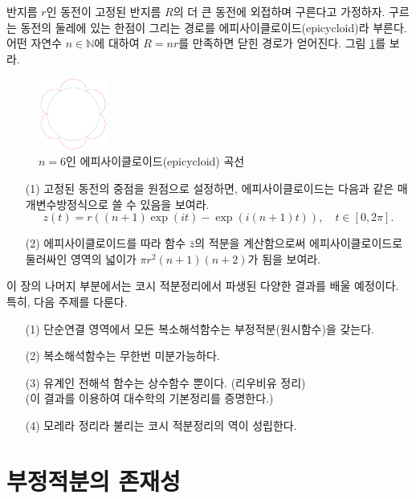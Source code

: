 \begin{salt_exercise} \label{ex-3-22}
반지름 $r$인 동전이 고정된 반지름 $R$의  더 큰 동전에 외접하며 구른다고 가정하자.
구르는 동전의 둘레에 있는 한점이 그리는 경로를 에피사이클로이드(epicycloid)라 부른다.
어떤 자연수 $n\in\mathbb N$에 대하여 $R=nr$를 만족하면 닫힌 경로가 얻어진다.
그림 \ref{fig-3-15}를 보라.

\begin{figure}[!h]
\begin{center}
\includegraphics[width=0.2\textwidth]{./SaltChapter/figs/fig-3-15}
\end{center}
\caption{$n=6$인 에피사이클로이드(epicycloid) 곡선}
\label{fig-3-15}
\end{figure}

\begin{itemize}
\item[(1)] 고정된 동전의 중점을 원점으로 설정하면,
에피사이클로이드는 다음과 같은 매개변수방정식으로 쓸 수 있음을 보여라.
\[
 z(t) = r((n+1)\exp(it) - \exp(i(n+1)t)), \quad t\in [0,2\pi].
\]
\item[(2)] 에피사이클로이드를 따라 함수 $\bar z$의 적분을 계산함으로써
에피사이클로이드로 둘러싸인 영역의 넓이가 $\pi r^2(n+1)(n+2)$가 됨을 보여라.
\end{itemize}
\end{salt_exercise}

이 장의 나머지 부분에서는
코시 적분정리에서 파생된 다양한 결과를 배울 예정이다.
특히, 다음 주제를 다룬다.

\begin{itemize}
\item[(1)] 단순연결 영역에서 모든 복소해석함수는 부정적분(원시함수)을 갖는다.
\item[(2)] 복소해석함수는 무한번 미분가능하다.
\item[(3)] 유계인 전해석 함수는 상수함수 뿐이다. (리우비유 정리)  \\
(이 결과를 이용하여 대수학의 기본정리를 증명한다.)
\item[(4)] 모레라 정리라 불리는 코시 적분정리의 역이 성립한다.
\end{itemize}

\section{부정적분의 존재성}

